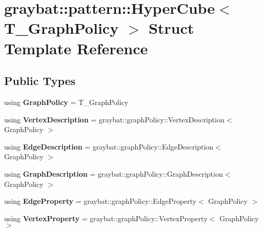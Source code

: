\hypertarget{structgraybat_1_1pattern_1_1HyperCube}{}\section{graybat\+:\+:pattern\+:\+:Hyper\+Cube$<$ T\+\_\+\+Graph\+Policy $>$ Struct Template Reference}
\label{structgraybat_1_1pattern_1_1HyperCube}
\subsection*{Public Types}
\begin{DoxyCompactItemize}
\item 
\hypertarget{structgraybat_1_1pattern_1_1HyperCube_a67a6d03f13aa7a690ba00e7dbc51712c}{}using {\bfseries Graph\+Policy} = T\+\_\+\+Graph\+Policy\label{structgraybat_1_1pattern_1_1HyperCube_a67a6d03f13aa7a690ba00e7dbc51712c}

\item 
\hypertarget{structgraybat_1_1pattern_1_1HyperCube_a0c88ca2cfe827c3debc91e8d021d44ca}{}using {\bfseries Vertex\+Description} = graybat\+::graph\+Policy\+::\+Vertex\+Description$<$ Graph\+Policy $>$\label{structgraybat_1_1pattern_1_1HyperCube_a0c88ca2cfe827c3debc91e8d021d44ca}

\item 
\hypertarget{structgraybat_1_1pattern_1_1HyperCube_adf392d9969a0a73da4dc7f72010dacd7}{}using {\bfseries Edge\+Description} = graybat\+::graph\+Policy\+::\+Edge\+Description$<$ Graph\+Policy $>$\label{structgraybat_1_1pattern_1_1HyperCube_adf392d9969a0a73da4dc7f72010dacd7}

\item 
\hypertarget{structgraybat_1_1pattern_1_1HyperCube_a4c23d00b62f8d88be7278a1b8d4051c4}{}using {\bfseries Graph\+Description} = graybat\+::graph\+Policy\+::\+Graph\+Description$<$ Graph\+Policy $>$\label{structgraybat_1_1pattern_1_1HyperCube_a4c23d00b62f8d88be7278a1b8d4051c4}

\item 
\hypertarget{structgraybat_1_1pattern_1_1HyperCube_a4e68fc6487ff5b3c32789914920b9314}{}using {\bfseries Edge\+Property} = graybat\+::graph\+Policy\+::\+Edge\+Property$<$ Graph\+Policy $>$\label{structgraybat_1_1pattern_1_1HyperCube_a4e68fc6487ff5b3c32789914920b9314}

\item 
\hypertarget{structgraybat_1_1pattern_1_1HyperCube_a1ac5d8bcd72ca589d1d6ee01aeddc836}{}using {\bfseries Vertex\+Property} = graybat\+::graph\+Policy\+::\+Vertex\+Property$<$ Graph\+Policy $>$\label{structgraybat_1_1pattern_1_1HyperCube_a1ac5d8bcd72ca589d1d6ee01aeddc836}

\end{DoxyCompactItemize}
